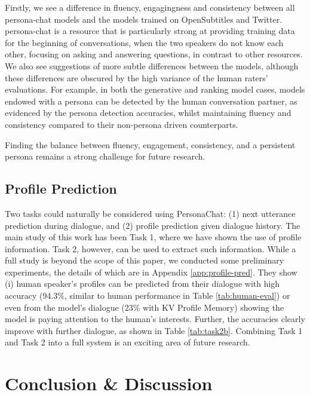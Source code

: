 \documentclass[11pt,a4paper]{article}
\begin{document}
 
Firstly, we see a difference in fluency, engagingness and consistency between all {\sc persona-chat}  models and the models trained on OpenSubtitles and Twitter. 
{\sc persona-chat} is a resource that is particularly strong at providing training data for the beginning of conversations, when the two speakers do not know each other, focusing on asking and answering questions, in contrast to other resources.
We also see suggestions of more subtle differences between the models, although these differences are obscured by the high variance of the human raters' evaluations. For example, in both the generative and ranking model cases, models endowed with a persona can be detected by the human conversation partner, as evidenced by the persona detection accuracies, whilst maintaining fluency and consistency compared to their non-persona driven counterparts.  




Finding the balance between fluency, engagement, consistency, and a persistent persona remains a strong challenge for future research.



\subsection{Profile Prediction}

Two tasks could naturally be considered using {\sc PersonaChat}:
(1) next utterance prediction during dialogue, and (2) profile prediction given dialogue history. 
The main study of this work has been Task 1, where we have shown the use of profile information.
Task 2, however, can be used to extract such information.
While a full study is beyond the scope of this paper, we conducted some preliminary experiments,
the details of which are in Appendix \ref{app:profile-pred}.
They show (i) human speaker's profiles can be predicted from their dialogue with high accuracy
(94.3\%, similar to human performance in Table \ref{tab:human-eval})
 or even from the model's dialogue (23\% with KV Profile Memory) 
showing the model is paying attention to the 
human's interests. Further, the accuracies clearly improve with further dialogue, as shown in Table 
\ref{tab:task2b}. Combining Task 1 and Task 2 into a full system is an exciting area of 
future research.









 \section{Conclusion \& Discussion}
\end{document}
